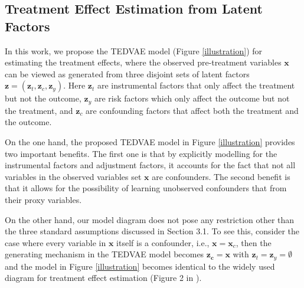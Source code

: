 \documentclass[letterpaper]{article} %
\begin{document}
\subsection*{Treatment Effect Estimation from Latent Factors}
%	
%	
%	


In this work, we propose the TEDVAE model (Figure \ref{illustration}) for estimating the treatment effects, where the observed pre-treatment variables $\mathbf{x}$ can be viewed as generated from three disjoint sets of latent factors $\mathbf{z} = (\mathbf{z}_t,\mathbf{z}_c, \mathbf{z}_y)$. 
Here $\mathbf{z}_t$ are instrumental factors that only affect the treatment but not the outcome, 
$\mathbf{z}_y$ are risk factors which only affect the outcome but not the treatment, 
and $\mathbf{z}_c$ are confounding factors that affect both the treatment and the outcome. 

On the one hand, the proposed TEDVAE model in Figure \ref{illustration} provides two important benefits. The first one is that by explicitly modelling for the instrumental factors and adjustment factors, it accounts for the fact that not all variables in the observed variables set $\mathbf{x}$ are confounders. The second benefit is that it allows for the possibility of learning unobserved confounders that from their proxy variables.

On the other hand, our model diagram does not pose any restriction other than the three standard assumptions discussed in Section 3.1. 
To see this, consider the case where every variable in $\mathbf{x}$ itself is a confounder, i.e., $\mathbf{x}=\mathbf{x}_c$, then the generating mechanism in the TEDVAE model becomes $\mathbf{z_c} = \mathbf{x}$ with $\mathbf{z}_t=\mathbf{z}_y=\emptyset$ and the model in Figure \ref{illustration} becomes identical to the widely used diagram for treatment effect estimation (Figure 2 in \cite{Imbens2019}).
\end{document}

